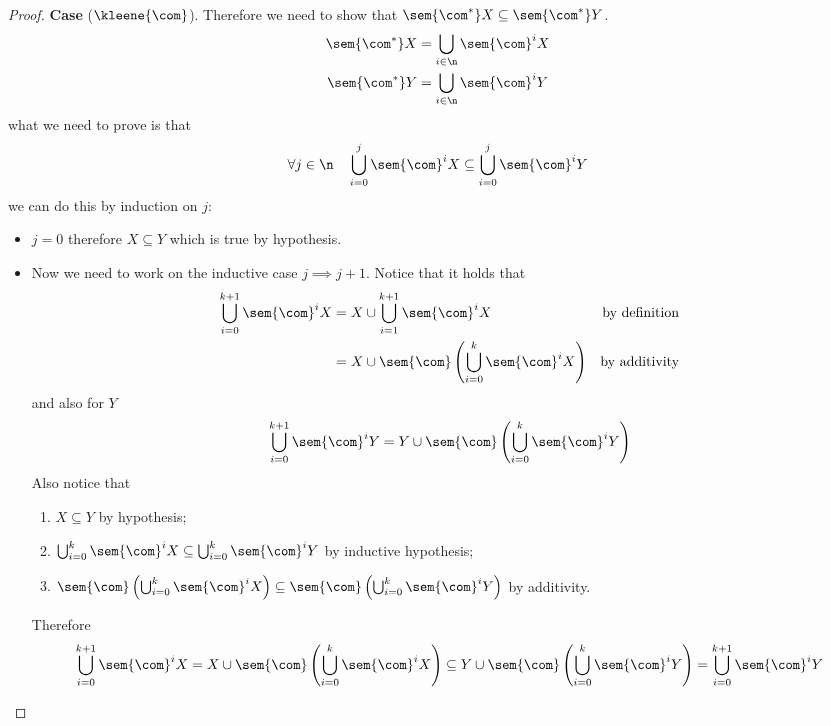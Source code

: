 \begin{proof}
  \noindent
  \textbf{Case} (\(\kleene{\com}\)). Therefore we need to show
  that \(\sem{\com^*}X \subseteq \sem{\com^*}Y \).
  \begin{align*}
    \sem{\com^*}X & = \bigcup_{i\in\n}\sem{\com}^i X \\
    \sem{\com^*}Y & = \bigcup_{i\in\n}\sem{\com}^i Y
  \end{align*}
  what we need to prove is that
  \[\forall j \in \n \quad \bigcup_{i=0}^j\sem{\com}^i X \subseteq
    \bigcup_{i=0}^j\sem{\com}^i Y\]
  we can do this by induction on \(j\):
  \begin{itemize}
  \item \(j=0\) therefore \(X\subseteq Y\) which is true by
    hypothesis.
  \item Now we need to work on the inductive case
    \(j \implies j+1\). Notice that it holds that
    \begin{align*}
      \bigcup_{i=0}^{k+1}\sem{\com}^i X & = X \cup \bigcup_{i=1}^{k+1}\sem{\com}^i X & \text{by definition} \\
                                        & = X \cup \sem{\com}\left(\bigcup_{i=0}^{k}\sem{\com}^i X\right) & \text{by additivity}
    \end{align*}
    and also for \(Y\)
    \begin{equation*}
      \bigcup_{i=0}^{k+1}\sem{\com}^i Y = Y \cup \sem{\com}\left(\bigcup_{i=0}^{k}\sem{\com}^i Y\right)
    \end{equation*}
    Also notice that
    \begin{enumerate}[label=(\roman*)]
    \item \(X \subseteq Y\) by hypothesis;
    \item
      \(\bigcup_{i=0}^{k}\sem{\com}^i X \subseteq
      \bigcup_{i=0}^{k}\sem{\com}^i Y\) by inductive hypothesis;
    \item 
      \(\sem{\com}\left(\bigcup_{i=0}^{k}\sem{\com}^i X\right)
      \subseteq \sem{\com}\left(\bigcup_{i=0}^{k}\sem{\com}^i
        Y\right)\) by additivity.
    \end{enumerate}
    Therefore
    \[\bigcup_{i=0}^{k+1}\sem{\com}^i X = X \cup
      \sem{\com}\left(\bigcup_{i=0}^{k}\sem{\com}^i X\right)
      \subseteq Y \cup \sem{\com}\left(\bigcup_{i=0}^{k}\sem{\com}^i
        Y\right) = \bigcup_{i=0}^{k+1}\sem{\com}^i Y \]
  \end{itemize}
\end{proof}

